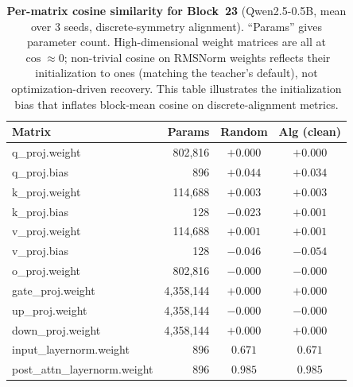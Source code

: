 \documentclass{article}
\begin{document}
\begin{table}[h]
\centering
\caption{\textbf{Per-matrix cosine similarity for Block~23} (Qwen2.5-0.5B, mean over 3 seeds, discrete-symmetry alignment). ``Params'' gives parameter count. High-dimensional weight matrices are all at $\cos \approx 0$; non-trivial cosine on RMSNorm weights reflects their initialization to ones (matching the teacher's default), not optimization-driven recovery. This table illustrates the initialization bias that inflates block-mean cosine on discrete-alignment metrics.}
\label{tab:per-matrix}
\small
\begin{tabular}{@{}l r cc@{}}
\toprule
\textbf{Matrix} & \textbf{Params} & \textbf{Random} & \textbf{Alg (clean)} \\
\midrule
q\_proj.weight & 802,816 & $+0.000$ & $+0.000$ \\
q\_proj.bias & 896 & $+0.044$ & $+0.034$ \\
k\_proj.weight & 114,688 & $+0.003$ & $+0.003$ \\
k\_proj.bias & 128 & $-0.023$ & $+0.001$ \\
v\_proj.weight & 114,688 & $+0.001$ & $+0.001$ \\
v\_proj.bias & 128 & $-0.046$ & $-0.054$ \\
o\_proj.weight & 802,816 & $-0.000$ & $-0.000$ \\
gate\_proj.weight & 4,358,144 & $+0.000$ & $+0.000$ \\
up\_proj.weight & 4,358,144 & $-0.000$ & $-0.000$ \\
down\_proj.weight & 4,358,144 & $+0.000$ & $+0.000$ \\
input\_layernorm.weight & 896 & $0.671$ & $0.671$ \\
post\_attn\_layernorm.weight & 896 & $0.985$ & $0.985$ \\
\bottomrule
\end{tabular}
\end{table}
\end{document}
